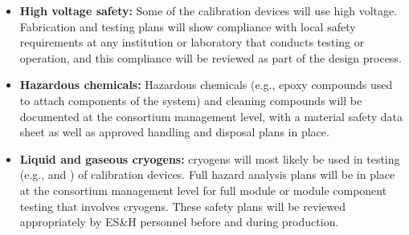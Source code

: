 \begin{itemize}

\item {\bf High voltage safety:} Some of the calibration devices will use high voltage. Fabrication and testing plans will show compliance with local  safety requirements at any institution or laboratory that conducts testing or operation, and this compliance will be reviewed as part of the design process.

\item {\bf Hazardous chemicals:} Hazardous chemicals (e.g., epoxy compounds used to attach components of the system) and cleaning compounds will be documented at the consortium management level, with a material safety data sheet as well as approved handling and disposal plans in place.

\item {\bf Liquid and gaseous cryogens:} cryogens will most likely be used in testing (e.g.,  and \lar) of calibration devices. Full hazard analysis plans will be in place at the consortium management level for full module or module component testing that involves cryogens. These safety plans will be reviewed appropriately by  ES\&H personnel before and during production.

\end{itemize}



